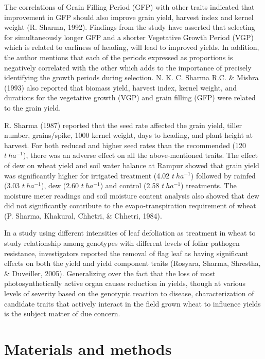 \documentclass[12pt,oneside]{dukestatscithesis} %
\theoremstyle{definition}
\theoremstyle{definition}
\theoremstyle{definition}
\theoremstyle{remark}
\begin{document}
The correlations of Grain Filling Period (GFP) with other traits
indicated that improvement in GFP should also improve grain yield,
harvest index and kernel weight (R. Sharma, 1992). Findings from the
study have asserted that selecting for simultaneously longer GFP and a
shorter Vegetative Growth Period (VGP) which is related to earliness of
heading, will lead to improved yields. In addition, the author mentions
that each of the periods expressed as proportions is negatively
correlated with the other which adds to the importance of precisely
identifying the growth periods during selection. N. K. C. Sharma R.C. \&
Mishra (1993) also reported that biomass yield, harvest index, kernel
weight, and durations for the vegetative growth (VGP) and grain filling
(GFP) were related to the grain yield.

R. Sharma (1987) reported that the seed rate affected the grain yield,
tiller number, grains/spike, 1000 kernel weight, days to heading, and
plant height at harvest. For both reduced and higher seed rates than the
recommended (120 \(t\ ha^{-1}\)), there was an adverse effect on all the
above-mentioned traits. The effect of dew on wheat yield and soil water
balance at Rampur showed that grain yield was significantly higher for
irrigated treatment (4.02 \(t\ ha^{-1}\)) followed by rainfed (3.03
\(t\ ha^{-1}\)), dew (2.60 \(t\ ha^{-1}\)) and control (2.58
\(t\ ha^{-1}\)) treatments. The moisture meter readings and soil
moisture content analysis also showed that dew did not significantly
contribute to the evapo-transpiration requirement of wheat (P. Sharma,
Khakural, Chhetri, \& Chhetri, 1984).

In a study using different intensities of leaf defoliation as treatment
in wheat to study relationship among genotypes with different levels of
foliar pathogen resistance, investigators reported the removal of flag
leaf as having significant effects on both the yield and yield component
traits (Rosyara, Sharma, Shrestha, \& Duveiller, 2005). Generalizing
over the fact that the loss of most photosynthetically active organ
causes reduction in yields, though at various levels of severity based
on the genotypic reaction to disease, characterization of candidate
traits that actively interact in the field grown wheat to influence
yields is the subject matter of due concern.

\chapter{Materials and methods}\label{mat-met}
\end{document}
